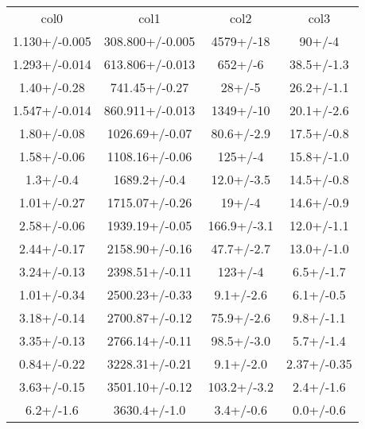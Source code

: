\begin{table}
\begin{tabular}{cccc}
col0 & col1 & col2 & col3 \\
1.130+/-0.005 & 308.800+/-0.005 & 4579+/-18 & 90+/-4 \\
1.293+/-0.014 & 613.806+/-0.013 & 652+/-6 & 38.5+/-1.3 \\
1.40+/-0.28 & 741.45+/-0.27 & 28+/-5 & 26.2+/-1.1 \\
1.547+/-0.014 & 860.911+/-0.013 & 1349+/-10 & 20.1+/-2.6 \\
1.80+/-0.08 & 1026.69+/-0.07 & 80.6+/-2.9 & 17.5+/-0.8 \\
1.58+/-0.06 & 1108.16+/-0.06 & 125+/-4 & 15.8+/-1.0 \\
1.3+/-0.4 & 1689.2+/-0.4 & 12.0+/-3.5 & 14.5+/-0.8 \\
1.01+/-0.27 & 1715.07+/-0.26 & 19+/-4 & 14.6+/-0.9 \\
2.58+/-0.06 & 1939.19+/-0.05 & 166.9+/-3.1 & 12.0+/-1.1 \\
2.44+/-0.17 & 2158.90+/-0.16 & 47.7+/-2.7 & 13.0+/-1.0 \\
3.24+/-0.13 & 2398.51+/-0.11 & 123+/-4 & 6.5+/-1.7 \\
1.01+/-0.34 & 2500.23+/-0.33 & 9.1+/-2.6 & 6.1+/-0.5 \\
3.18+/-0.14 & 2700.87+/-0.12 & 75.9+/-2.6 & 9.8+/-1.1 \\
3.35+/-0.13 & 2766.14+/-0.11 & 98.5+/-3.0 & 5.7+/-1.4 \\
0.84+/-0.22 & 3228.31+/-0.21 & 9.1+/-2.0 & 2.37+/-0.35 \\
3.63+/-0.15 & 3501.10+/-0.12 & 103.2+/-3.2 & 2.4+/-1.6 \\
6.2+/-1.6 & 3630.4+/-1.0 & 3.4+/-0.6 & 0.0+/-0.6 \\
\end{tabular}
\end{table}

